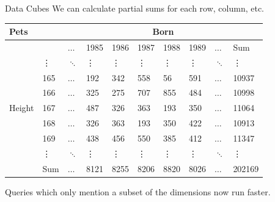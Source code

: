 \documentclass{beamer}
\theoremstyle{definition}
\theoremstyle{definition}
\begin{document}
\begin{frame}{Data Cubes}
    We can calculate partial sums for each row, column, etc.\cite{Gray96}
    \begin{table}[h]\footnotesize
        \begin{tabular} { | l | l | l | l | l | l | l | l | l | l |}
        \hline
        \textbf{Pets} & & \multicolumn{8}{|c|}{Born} \\ \hline
        & & $\hdots$ & 1985 & 1986 & 1987 & 1988 & 1989 & $\hdots$ & Sum \\ \hline
        \multirow{7}{*}{Height}
        & \vdots & $\ddots$ & \vdots & \vdots & \vdots & \vdots & \vdots & $\ddots$ & \vdots \\
        & 165 & $\hdots$ & 192 & 342 & 558 & 56 & 591 & $\hdots$ & 10937 \\
        & 166 & $\hdots$ & 325 & 275 & 707 & 855 & 484 & $\hdots$ & 10998 \\
        & 167 & $\hdots$ & 487 & 326 & 363 & 193 & 350 & $\hdots$ & 11064 \\
        & 168 & $\hdots$ & 326 & 363 & 193 & 350 & 422 & $\hdots$ & 10913 \\
        & 169 & $\hdots$ & 438 & 456 & 550 & 385 & 412 & $\hdots$ & 11347 \\
        & \vdots & $\ddots$ & \vdots & \vdots & \vdots & \vdots & \vdots & $\ddots$ & \vdots \\
        & Sum & $\hdots$ & 8121 & 8255 & 8206 & 8820 & 8026 & $\hdots$ & 202169 \\
        \hline
        \end{tabular}
    \end{table}
    \pause
    Queries which only mention a subset of the dimensions now run faster.
\end{frame}
\end{document}
